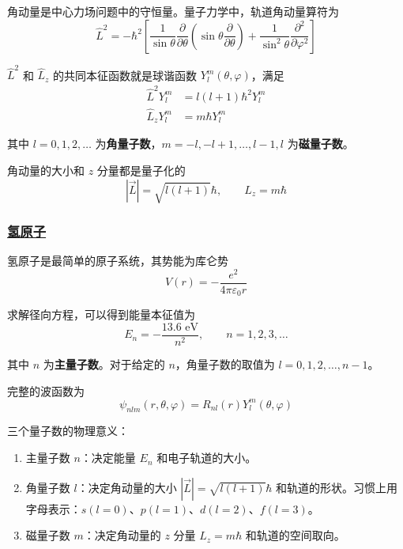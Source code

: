 角动量是中心力场问题中的守恒量。量子力学中，轨道角动量算符为
\begin{equation}
    \hat{L}^2 = -\hbar^2\left[\frac{1}{\sin\theta}\frac{\partial}{\partial\theta}\left(\sin\theta\frac{\partial}{\partial\theta}\right) + \frac{1}{\sin^2\theta}\frac{\partial^2}{\partial\varphi^2}\right]
\end{equation}

$\hat{L}^2$ 和 $\hat{L}_z$ 的共同本征函数就是球谐函数 $Y_l^m(\theta,\varphi)$，满足
\begin{align}
    \hat{L}^2 Y_l^m &= l(l+1)\hbar^2 Y_l^m \\
    \hat{L}_z Y_l^m &= m\hbar Y_l^m
\end{align}

其中 $l = 0, 1, 2, \ldots$ 为\textbf{角量子数}，$m = -l, -l+1, \ldots, l-1, l$ 为\textbf{磁量子数}。

角动量的大小和 $z$ 分量都是量子化的
\begin{equation}
    |\vec{L}| = \sqrt{l(l+1)}\hbar, \qquad L_z = m\hbar
\end{equation}

\subsubsection{\protect\hyperlink{:}{氢原子}}

氢原子是最简单的原子系统，其势能为库仑势
\begin{equation}
    V(r) = -\frac{e^2}{4\pi\varepsilon_0 r}
\end{equation}

求解径向方程，可以得到能量本征值为
\begin{equation}
    \boxed{E_n = -\frac{13.6 \text{ eV}}{n^2}, \qquad n = 1, 2, 3, \ldots}
\end{equation}

其中 $n$ 为\textbf{主量子数}。对于给定的 $n$，角量子数的取值为 $l = 0, 1, 2, \ldots, n-1$。

完整的波函数为
\begin{equation}
    \psi_{nlm}(r,\theta,\varphi) = R_{nl}(r)Y_l^m(\theta,\varphi)
\end{equation}

三个量子数的物理意义：
\begin{enumerate}
    \item 主量子数 $n$：决定能量 $E_n$ 和电子轨道的大小。
    \item 角量子数 $l$：决定角动量的大小 $|\vec{L}| = \sqrt{l(l+1)}\hbar$ 和轨道的形状。习惯上用字母表示：$s(l=0)$、$p(l=1)$、$d(l=2)$、$f(l=3)$。
    \item 磁量子数 $m$：决定角动量的 $z$ 分量 $L_z = m\hbar$ 和轨道的空间取向。
\end{enumerate}

